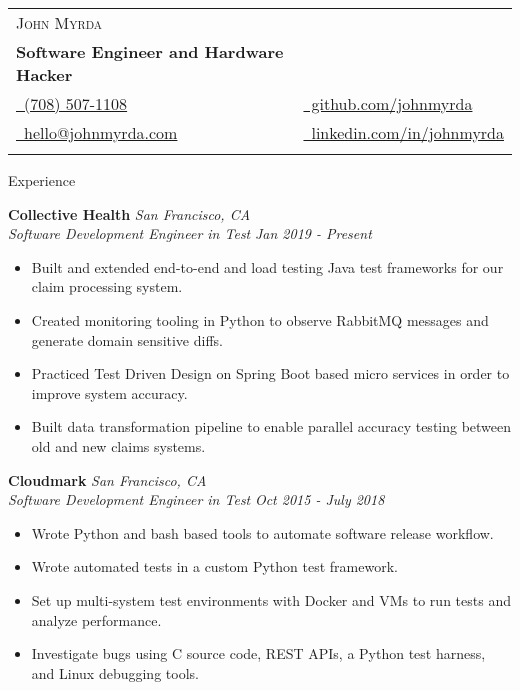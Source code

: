 \documentclass{article}
\newenvironment{changemargin}[2]{%
  \begin{list}{}{%
    \setlength{\topsep}{0pt}%
    \setlength{\leftmargin}{#1}%
    \setlength{\rightmargin}{#2}%
    \setlength{\listparindent}{\parindent}%
    \setlength{\itemindent}{\parindent}%
    \setlength{\parsep}{\parskip}%
  }%
  \item[]}{\end{list}
}
\newcommand{\lineover}{
	\begin{changemargin}{-0.05in}{-0.05in}
		\vspace*{-8pt}
		\hrulefill \\
		\vspace*{-2pt}
	\end{changemargin}
}
\newcommand{\header}[1]{
	\begin{changemargin}{-0.5in}{-0.5in}
		\scshape{#1}\\
  	\lineover
	\end{changemargin}
}
\newcommand{\contact}[7]{
	\begin{changemargin}{-0.5in}{-0.5in}
		\begin{tabular}{l l}
			\Large \scshape {#1}\\
			\textbf{#2}\\
			{#3} & {#5}\\ 
			{#4} & {#6}\\
			 & {#7}\\
		\end{tabular}
	\end{changemargin}
}
\newenvironment{body} {
	\vspace*{-16pt}
	\begin{changemargin}{-0.25in}{-0.5in}
  }	
	{\end{changemargin}
}
\begin{document}
\contact{John Myrda}
{Software Engineer and Hardware Hacker}
{\href{tel:7085071108}{\faPhone\ (708) 507-1108}}
{\href{mailto:hello@johnmyrda.com}{\faEnvelope\ hello@johnmyrda.com}}
{\href{https://github.com/johnmyrda/resume}{\faGithub\ github.com/johnmyrda}}
{\href{https://www.linkedin.com/in/johnmyrda}{\faLinkedin\ linkedin.com/in/johnmyrda}}

\header{Experience}


\begin{body}

	\vspace{20pt}

	\textbf{Collective Health} \hfill \emph{San Francisco, CA}\\
	\emph{Software Development Engineer in Test} \hfill \emph{Jan 2019 - Present}\\
	\begin{itemize} \itemsep -0pt  %
	    \item Built and extended end-to-end and load testing Java test frameworks for our claim processing system.
	    \item Created monitoring tooling in Python to observe RabbitMQ messages and generate domain sensitive diffs.
	    \item Practiced Test Driven Design on Spring Boot based micro services in order to improve system accuracy.
	    \item Built data transformation pipeline to enable parallel accuracy testing between old and new claims systems.
	\end{itemize}	

	\textbf{Cloudmark} \hfill \emph{San Francisco, CA}\\
	\emph{Software Development Engineer in Test} \hfill \emph{Oct 2015 - July 2018}\\
	\begin{itemize} \itemsep -0pt  %
	    \item Wrote Python and bash based tools to automate software release workflow.
		\item Wrote automated tests in a custom Python test framework.
		\item Set up multi-system test environments with Docker and VMs to run tests and analyze performance.
\item Investigate bugs using C source code, REST APIs, a Python test harness, and Linux debugging tools.
	\end{itemize}


\end{body}
\end{document}
